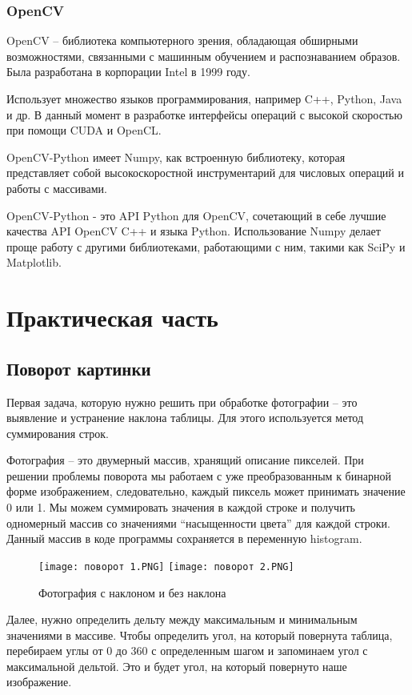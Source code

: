 \documentclass[a4paper, 12pt]{report}
\begin{document}
\subsection{OpenCV}
OpenCV – библиотека компьютерного зрения, обладающая обширными возможностями, связанными с машинным обучением и распознаванием образов. Была разработана в корпорации Intel в 1999 году.

Использует множество языков программирования, например C++, Python, Java и др. В данный момент в разработке интерфейсы операций с высокой скоростью при помощи CUDA и OpenCL.

OpenCV-Python имеет Numpy, как встроенную библиотеку, которая представляет собой высокоскоростной инструментарий для числовых операций и работы с массивами.

OpenCV-Python - это API Python для OpenCV, сочетающий в себе лучшие качества API OpenCV C++ и языка Python. Использование Numpy делает проще работу с другими библиотеками, работающими с ним, такими как SciPy и Matplotlib.

\chapter{Практическая часть}

\section{Поворот картинки}
Первая задача, которую нужно решить при обработке фотографии – это выявление и устранение наклона таблицы. Для этого используется метод суммирования строк.

Фотография – это двумерный массив, хранящий описание пикселей. При решении проблемы поворота мы работаем с уже преобразованным к бинарной форме изображением, следовательно, каждый пиксель может принимать значение 0 или 1. Мы можем суммировать значения в каждой строке и получить одномерный массив со значениями “насыщенности цвета” для каждой строки. Данный массив в коде программы сохраняется в переменную histogram.

\begin{figure}[ht]
    \centering
    \texttt{[image: поворот 1.PNG]}
    \texttt{[image: поворот 2.PNG]}
    \caption{Фотография с наклоном и без наклона}
\end{figure}

 Далее, нужно определить дельту между максимальным и минимальным значениями в массиве. Чтобы определить угол, на который повернута таблица, перебираем углы от 0 до 360 с определенным шагом и запоминаем угол с максимальной дельтой. Это и будет угол, на который повернуто наше изображение.
\end{document}
